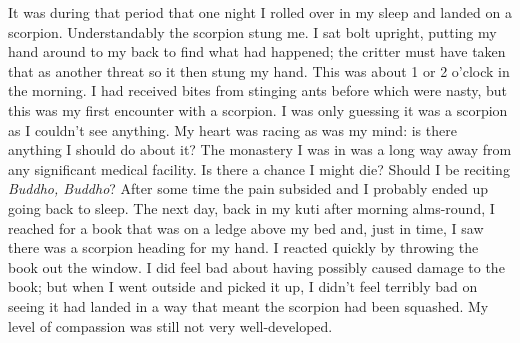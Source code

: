 It was during that period that one night I rolled over in my sleep and
landed on a scorpion. Understandably the scorpion stung me. I sat bolt
upright, putting my hand around to my back to find what had happened;
the critter must have taken that as another threat so it then stung my
hand. This was about 1 or 2 o'clock in the morning. I had received bites
from stinging ants before which were nasty, but this was my first
encounter with a scorpion. I was only guessing it was a scorpion as I
couldn't see anything. My heart was racing as was my mind: is there
anything I should do about it? The monastery I was in was a long way
away from any significant medical facility. Is there a chance I might
die? Should I be reciting \emph{Buddho, Buddho}? After some time the
pain subsided and I probably ended up going back to sleep. The next day,
back in my kuti after morning alms-round, I reached for a book that was
on a ledge above my bed and, just in time, I saw there was a scorpion
heading for my hand. I reacted quickly by throwing the book out the
window. I did feel bad about having possibly caused damage to the book;
but when I went outside and picked it up, I didn't feel terribly bad on
seeing it had landed in a way that meant the scorpion had been squashed.
My level of compassion was still not very well-developed.


